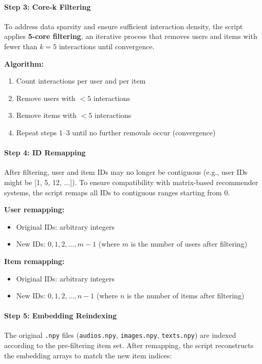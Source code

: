 \paragraph{Step 3: Core-k Filtering}
To address data sparsity and ensure sufficient interaction density, the script applies \textbf{5-core filtering}, an iterative process that removes users and items with fewer than $k=5$ interactions until convergence.

\textbf{Algorithm:}
\begin{enumerate}
    \item Count interactions per user and per item
    \item Remove users with $< 5$ interactions
    \item Remove items with $< 5$ interactions
    \item Repeat steps 1--3 until no further removals occur (convergence)
\end{enumerate}


\paragraph{Step 4: ID Remapping}
After filtering, user and item IDs may no longer be contiguous (e.g., user IDs might be [1, 5, 12, ...]). To ensure compatibility with matrix-based recommender systems, the script remaps all IDs to contiguous ranges starting from 0.

\textbf{User remapping:}
\begin{itemize}
    \item Original IDs: arbitrary integers
    \item New IDs: $0, 1, 2, \ldots, m-1$ (where $m$ is the number of users after filtering)
\end{itemize}

\textbf{Item remapping:}
\begin{itemize}
    \item Original IDs: arbitrary integers
    \item New IDs: $0, 1, 2, \ldots, n-1$ (where $n$ is the number of items after filtering)
\end{itemize}

\paragraph{Step 5: Embedding Reindexing}
The original \texttt{.npy} files (\texttt{audios.npy}, \texttt{images.npy}, \texttt{texts.npy}) are indexed according to the pre-filtering item set. After remapping, the script reconstructs the embedding arrays to match the new item indices:

